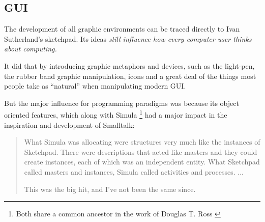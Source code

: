 \subsection{GUI}

The development of all graphic environments can be traced directly to
Ivan Sutherland's sketchpad. Its ideas \emph{still influence how every
  computer user thinks about computing.}\cite{graphics:sutherland__sketchpad}

It did that by introducing graphic metaphors and devices, such as the
light-pen, the rubber band graphic manipulation, icons and a great
deal of the things most people take as ``natural'' when manipulating
modern GUI. \cite{graphics:sutherland__sketchpad}

But the major influence for programming paradigms was because its
object oriented features, which along with Simula \footnote{Both share
  a common ancestor in the work of Douglas T. Ross
  \cite{graphics:sutherland__sketchpad}} had a major impact in the
inspiration and development of Smalltalk: 

\begin{quote}
  What Simula was allocating were structures very much like the
  instances of Sketchpad. There were descriptions that acted like
  masters and they could create instances, each of which was an
  independent entity. What Sketchpad called masters and instances,
  Simula called activities and processes. ...

  This was the big hit, and I've not been the same since.
  \cite{smalltalk:kay_alan__early_history_smalltalk}
\end{quote} 



